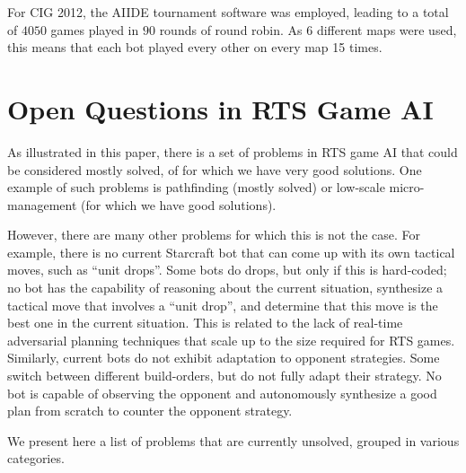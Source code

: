 \documentclass[journal]{IEEEtran}
\begin{document}
For CIG 2012, the AIIDE tournament software was employed,
leading to a total of $4050$ games played in $90$ rounds
of round robin. As 6 different maps were used, this means
that each bot played every other on every map 15 times. 



\section{Open Questions in RTS Game AI}\label{sec:questions}

As illustrated in this paper, there is a set of problems in RTS game AI that could be considered mostly solved, of for which we have very good solutions. One example of such problems is pathfinding (mostly solved) or low-scale micro-management (for which we have good solutions). 

However, there are many other problems for which this is not the case. For example, there is no current Starcraft bot that can come up with its own tactical moves, such as ``unit drops''. Some bots do drops, but only if this is hard-coded; no bot has the capability of reasoning about the current situation, synthesize a tactical move that involves a ``unit drop'', and determine that this move is the best one in the current situation. This is related to the lack of real-time adversarial planning techniques that scale up to the size required for RTS games. Similarly, current bots do not exhibit adaptation to opponent strategies. Some switch between different build-orders, but do not fully adapt their strategy. No bot is capable of observing the opponent and autonomously synthesize a good plan from scratch to counter the opponent strategy.

We present here a list of problems that are currently unsolved, grouped in various categories.
\end{document}
